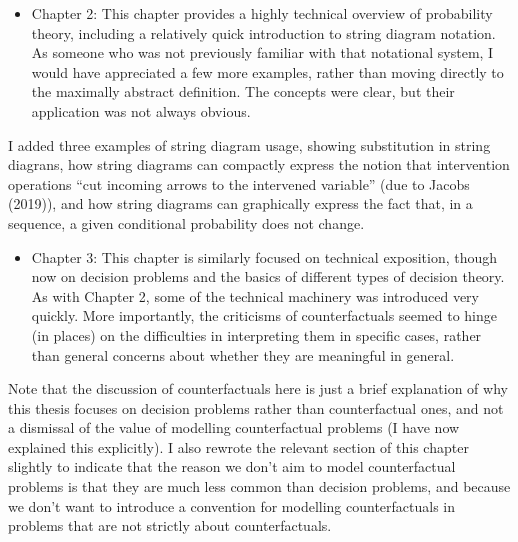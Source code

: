 \documentclass[12pt, a4paper]{article}
\begin{document}
\begin{itemize}
    \item Chapter 2: This chapter provides a highly technical overview of probability theory, including a relatively quick introduction to string diagram notation. As someone who was not previously familiar with that notational system, I would have appreciated a few more examples, rather than moving directly to the maximally abstract definition. The concepts were clear, but their application was not always obvious.
\end{itemize}

I added three examples of string diagram usage, showing substitution in string diagrans, how string diagrams can compactly express the notion that intervention operations ``cut incoming arrows to the intervened variable'' (due to Jacobs (2019)), and how string diagrams can graphically express the fact that, in a sequence, a given conditional probability does not change.

\begin{itemize}
    \item Chapter 3: This chapter is similarly focused on technical exposition, though now on decision problems and the basics of different types of decision theory. As with Chapter 2, some of the technical machinery was introduced very quickly. More importantly, the criticisms of counterfactuals seemed to hinge (in places) on the difficulties in interpreting them in specific cases, rather than general concerns about whether they are meaningful in general.
\end{itemize}

Note that the discussion of counterfactuals here is just a brief explanation of why this thesis focuses on decision problems rather than counterfactual ones, and not a dismissal of the value of modelling counterfactual problems (I have now explained this explicitly). I also rewrote the relevant section of this chapter slightly to indicate that the reason we don't aim to model counterfactual problems is that they are much less common than decision problems, and because we don't want to introduce a convention for modelling counterfactuals in problems that are not strictly about counterfactuals.
\end{document}
